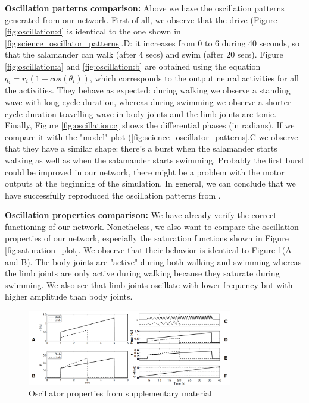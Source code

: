 \documentclass{cmc}
\begin{document}
\textbf{Oscillation patterns comparison:} Above we have the oscillation patterns generated from our network. First of all, we observe that the drive (Figure \ref{fig:oscillation:d} is identical to the one shown in \ref{fig:science_oscillator_patterns}.D: it increases from 0 to 6 during 40 seconds, so that the salamander can walk (after 4 secs) and swim (after 20 secs). Figure \ref{fig:oscillation:a} and \ref{fig:oscillation:b} are obtained using the equation $q_i = r_i(1 + cos(\theta_i))$, which corresponds to the output neural activities for all the activities. They behave as expected: during walking we observe a standing wave with long cycle duration, whereas during swimming we observe a shorter-cycle duration travelling wave in body joints and the limb joints are tonic. Finally, Figure \ref{fig:oscillation:c} shows the differential phases (in radians). If we compare it with the "model" plot (\ref{fig:science_oscillator_patterns}.C we observe that they have a similar shape: there's a burst when the salamander starts walking as well as when the salamander starts swimming. Probably the first burst could be improved in our network, there might be a problem with the motor outputs at the beginning of the simulation. In general, we can conclude that we have successfully reproduced the oscillation patterns from \cite{ijspeert2007swimming}.


\textbf{Oscillation properties comparison:} We have already verify the correct functioning of our network. Nonetheless, we also want to compare the oscillation properties of our network, especially the saturation functions shown in Figure \ref{fig:saturation_plot}. We observe that their behavior is identical to Figure \ref{fig:science_oscillator_properties}(A and B). The body joints are "active" during both walking and swimming whereas the limb joints are only active during walking because they saturate during swimming. We also see that limb joints oscillate with lower frequency but with higher amplitude than body joints.

\begin{figure}[h]
  \centering
  \includegraphics[width=0.8\textwidth]{figures/science_oscillator_properties}
  \caption{Oscillator properties from \cite{ijspeert2007swimming} supplementary material}
  \label{fig:science_oscillator_properties}
\end{figure}
\end{document}
